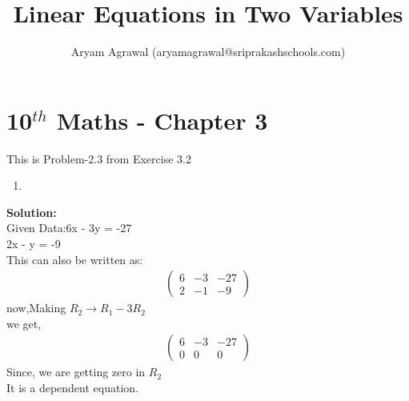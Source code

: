 \documentclass[12pt]{article}
\title{Linear Equations in Two Variables}
\author{Aryam Agrawal (aryamagrawal@sriprakashschools.com)}
\newcommand{\myvec}[1]{\ensuremath{\begin{pmatrix}#1\end{pmatrix}}}
\newcommand{\solution}{\noindent \textbf{Solution: }}
\begin{document}
\maketitle
\section*{10$^{th}$ Maths - Chapter 3}
This is Problem-2.3 from Exercise 3.2
\begin{enumerate}
\item 
\end{enumerate}
\solution\\
Given Data:6x - 3y = -27\\ 
           2x - y = -9\\
This can also be written as:
\begin{align}
\myvec{6&-3&-27\\2&-1&-9}
\end{align}
now,Making $R_2 \xrightarrow\ R_1 - 3R_2$\\ 
we get,
\begin{align}
\myvec{6&-3&-27\\0&0&0}
\end{align}
Since, we are getting zero in $R_2$\\
It is a dependent equation.
\end{document}
